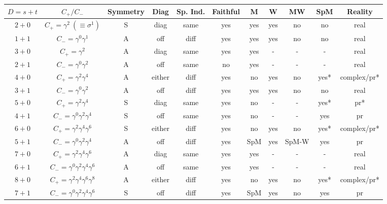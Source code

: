 \documentclass[11pt]{article}
\begin{document}
\begin{adjustwidth}{-2cm}{-2cm}

\begin{tabular}{|c|c|c|c|c|c|c|c|c|c|c|}
    \hline
    $D=s+t$ & $C_+/C_-$ & Symmetry & Diag & Sp. Ind. & Faithful & M & W & MW & SpM & Reality\\
    \hline
    $2{+}0$ &
    $C_+=\gamma^2\ (\equiv\sigma^1)$ &
    S & diag & same & yes & yes & yes & no & no & real\\
    \hline
    $1{+}1$ &
    $C_-=\gamma^0\gamma^1$ &
    A & off & diff & yes & yes & yes & no & no & real\\
    \hline
    $3{+}0$ &
    $C_+=\gamma^2$ &
    A & diag & same & yes & yes & - & - & - & real\\
    \hline
    $2{+}1$ &
    $C_-=\gamma^0\gamma^2$ &
    A & off & same & no & yes & - & - & - & real\\
    \hline
    $4{+}0$ &
    $C_+=\gamma^2\gamma^4$ &
    A & either  & diff & yes & no & yes & no & yes* & complex/pr*\\
    \hline
    $3{+}1$ &
    $C_-=\gamma^0\gamma^2$ &
    A & off  & diff & yes & yes & yes & no & no & real\\
    \hline
    $5{+}0$ &
    $C_+=\gamma^2\gamma^4$ &
    S & diag & same & yes & no & - & - & yes* & pr*\\
    \hline
    $4{+}1$ &
    $C_-=\gamma^0\gamma^2\gamma^4$ &
    S & off & same & yes & no & - & - & yes & pr\\
    \hline
    $6{+}0$ &
    $C_+=\gamma^2\gamma^4\gamma^6$ &
    S & either  & diff & yes & no & yes & no & yes* & complex/pr*\\
    \hline
    $5{+}1$ &
    $C_-=\gamma^0\gamma^2\gamma^4$ &
    A & off  & diff & yes & SpM & yes & SpM-W & yes & pr\\
    \hline
    $7{+}0$ &
    $C_+=\gamma^2\gamma^4\gamma^6$ &
    A & diag & same & yes & yes & - & - & - & real\\
    \hline
    $6{+}1$ &
    $C_-=\gamma^0\gamma^2\gamma^4\gamma^6$ &
    A & off & same & yes & yes & - & - & - & real\\
    \hline
    $8{+}0$ &
    $C_+=\gamma^2\gamma^4\gamma^6\gamma^8$ &
    A & either  & diff & yes & no & yes & no & yes* & complex/pr*\\
    \hline
    $7{+}1$ &
    $C_-=\gamma^0\gamma^2\gamma^4\gamma^6$ &
    S & off  & diff & yes & SpM & yes & no & yes & pr\\
    \hline

\end{tabular}
\end{adjustwidth}
\end{document}
